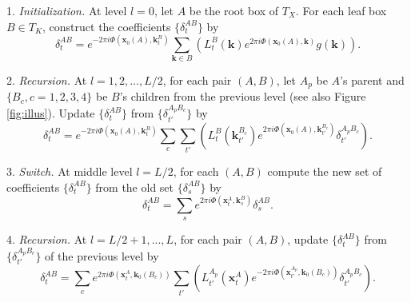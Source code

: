 
1. {\it Initialization.} At level $l=0$, let $A$ be the root box of $T_X$. For each leaf box $B\in T_K$, construct the coefficients $\{\delta_t^{AB}\}$ by
\begin{equation} \label{Delta1}
\delta_t^{AB}=e^{-2\pi i
  \Phi(\mathbf{x}_0(A),\mathbf{k}_t^B)}\sum_{\mathbf{k}\in B}\left(
  L_t^B(\mathbf{k}) e^{2\pi i \Phi(\mathbf{x}_0(A),\mathbf{k})}g(\mathbf{k}) \right).
\end{equation}

2. {\it Recursion.} At $l=1,2,...,L/2$, for each pair $(A,B)$, let $A_p$ be $A$'s parent and $\{B_c, c=1,2,3,4\}$ be $B$'s children from the previous level (see also Figure \ref{fig:illus}). Update $\{\delta_t^{AB}\}$ from $\{\delta_{t'}^{A_pB_c}\}$ by
\begin{equation} \label{Delta2}
\delta_t^{AB}=e^{-2\pi i
  \Phi(\mathbf{x}_0(A),\mathbf{k}_t^B)}\sum_c\sum_{t'}
\left(L_t^B(\mathbf{k}_{t'}^{B_c})e^{2\pi i
  \Phi(\mathbf{x}_0(A),\mathbf{k}_{t'}^{B_c})}\delta_{t'}^{A_pB_c}\right).
\end{equation}

3. {\it Switch.} At middle level $l=L/2$, for each $(A,B)$ compute the new set of coefficients $\{\delta_t^{AB}\}$ from the old set $\{\delta_s^{AB}\}$ by
\begin{equation} \label{Delta3}
\delta^{AB}_t=
\sum_s e^{2\pi i \Phi(\mathbf{x}_t^A,\mathbf{k}_s^B)}\delta_s^{AB}.
\end{equation}
 
4. {\it Recursion.} At $l=L/2+1,...,L$, for each pair $(A,B)$, update $\{\delta_t^{AB}\}$ from $\{\delta_{t'}^{A_pB_c}\}$ of the previous level by
\begin{equation} \label{Delta4}
\delta_t^{AB}=\sum_c  e^{2\pi i \Phi(\mathbf{x}_t^A,\mathbf{k}_0(B_c))}\sum_{t'} \left( L_{t'}^{A_p}(\mathbf{x}_t^A) e^{-2\pi i \Phi(\mathbf{x}_{t'}^{A_p},\mathbf{k}_0(B_c))}\delta_{t'}^{A_pB_c}\right).
\end{equation}

